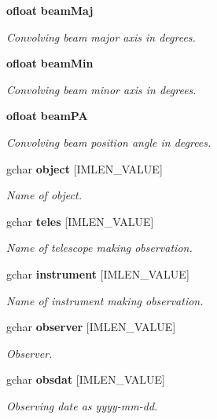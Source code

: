 \begin{CompactItemize}
{\bf ofloat} {\bf beam\-Maj}
\begin{CompactList}\small\item\em Convolving beam major axis in degrees. \item\end{CompactList}\item 
{\bf ofloat} {\bf beam\-Min}
\begin{CompactList}\small\item\em Convolving beam minor axis in degrees. \item\end{CompactList}\item 
{\bf ofloat} {\bf beam\-PA}
\begin{CompactList}\small\item\em Convolving beam position angle in degrees. \item\end{CompactList}\item 
gchar {\bf object} [IMLEN\_\-VALUE]
\begin{CompactList}\small\item\em Name of object. \item\end{CompactList}\item 
gchar {\bf teles} [IMLEN\_\-VALUE]
\begin{CompactList}\small\item\em Name of telescope making observation. \item\end{CompactList}\item 
gchar {\bf instrument} [IMLEN\_\-VALUE]
\begin{CompactList}\small\item\em Name of instrument making observation. \item\end{CompactList}\item 
gchar {\bf observer} [IMLEN\_\-VALUE]
\begin{CompactList}\small\item\em Observer. \item\end{CompactList}\item 
gchar {\bf obsdat} [IMLEN\_\-VALUE]
\begin{CompactList}\small\item\em Observing date as yyyy-mm-dd. \item\end{CompactList}\item 

\end{CompactItemize}
